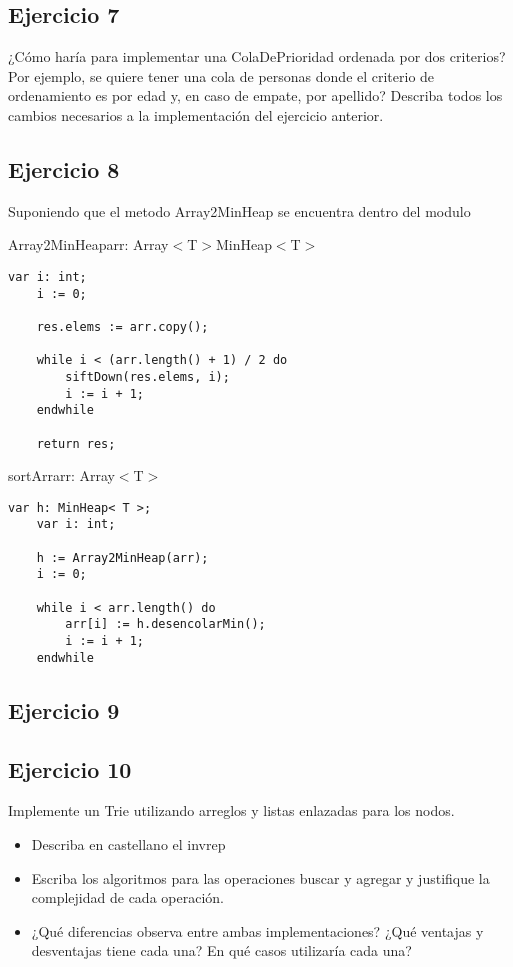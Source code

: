 \subsection{Ejercicio 7}
¿Cómo haría para implementar una ColaDePrioridad ordenada por dos criterios? Por ejemplo, se quiere tener una cola de personas donde el criterio de ordenamiento es por edad y, en caso de empate, por apellido? Describa todos los cambios necesarios a la implementación del ejercicio anterior.
\medskip
\hacer

\pagebreak

\subsection{Ejercicio 8}

Suponiendo que el metodo Array2MinHeap se encuentra dentro del modulo
\begin{proc}{Array2MinHeap}{\In arr: Array$<$T$>$}{MinHeap$<$T$>$}
	\begin{lstlisting}[numbers=none,frame=none]
	var i: int;
	i := 0;

	res.elems := arr.copy();
	
	while i < (arr.length() + 1) / 2 do
		siftDown(res.elems, i);
		i := i + 1;
	endwhile

	return res;
	\end{lstlisting}
\end{proc}

\begin{proc}{sortArr}{\Inout arr: Array$<$T$>$}{}
	\begin{lstlisting}[numbers=none,frame=none]
	var h: MinHeap< T >;
	var i: int;

	h := Array2MinHeap(arr);
	i := 0;

	while i < arr.length() do
		arr[i] := h.desencolarMin();
		i := i + 1;
	endwhile
	\end{lstlisting}
\end{proc}

\subsection{Ejercicio 9}
\hacer

\subsection{Ejercicio 10}
Implemente un Trie utilizando arreglos y listas enlazadas para los nodos.
\begin{itemize}
	\item Describa en castellano el invrep
	\item Escriba los algoritmos para las operaciones buscar y agregar y justifique la complejidad de cada operación.
	\item ¿Qué diferencias observa entre ambas implementaciones? ¿Qué ventajas y desventajas tiene cada una? En qué casos utilizaría cada una?
\end{itemize}

